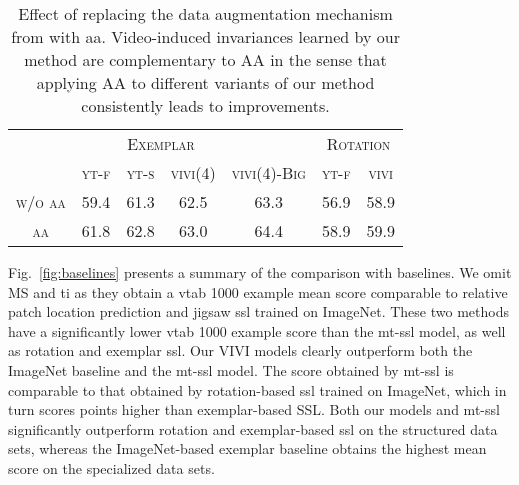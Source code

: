 \documentclass[10pt,twocolumn,letterpaper]{article}
\renewcommand{\paragraph}[1]{\noindent{\bf #1}\quad}
\begin{document}
{\begin{table}
    \centering
    \small
    \small
\setlength{\tabcolsep}{4pt}
\setlength{\extrarowheight}{5pt}
\renewcommand{\arraystretch}{0.75}
\begin{tabular}{ccccccc}
\toprule
\multicolumn{5}{c}{\textsc{Exemplar}} & \multicolumn{2}{c}{\textsc{Rotation}}  \\
\cmidrule(r){2-5}
\cmidrule(r){6-7}
& \textsc{yt-f} & \textsc{yt-s} & \textsc{vivi(4)} & \textsc{vivi(4)-Big} & \textsc{yt-f} & \textsc{vivi}  \\
\midrule
\textsc{w/o aa} &     59.4 &     61.3 &       62.5 &           63.3 &     56.9 &        58.9 \\
\textsc{aa}  & 61.8 & 62.8 &       63.0 &           64.4 &     58.9 &    59.9 \\
\bottomrule
\end{tabular}     \caption{Effect of replacing the data augmentation mechanism from \cite{szegedy2015going} with \gls{aa}. Video-induced invariances learned by our method are complementary to AA in the sense that applying AA to different variants of our method consistently leads to improvements.}\vspace{-4mm}
    \label{tab:autoaugment}
\end{table}

\paragraph{Comparison with related work} Fig.\ \ref{fig:baselines} presents a summary of the comparison with baselines. We omit MS and \gls{ti} as they obtain a \gls{vtab} 1000 example mean score comparable to relative patch location prediction \cite{doersch2015unsupervised} and jigsaw \cite{noroozi2016unsupervised} \gls{ssl} trained on ImageNet. These two methods have a significantly lower \gls{vtab} 1000 example score than the \gls{mt-ssl} model, as well as rotation and exemplar \gls{ssl}.
Our VIVI models clearly outperform both the ImageNet baseline and the \gls{mt-ssl} model. The score obtained by \gls{mt-ssl} is comparable to that obtained by rotation-based \gls{ssl} trained on ImageNet, which in turn scores  points higher than exemplar-based SSL. Both our models and \gls{mt-ssl} significantly outperform rotation and exemplar-based \gls{ssl} on the structured data sets, whereas the ImageNet-based exemplar baseline obtains the highest mean score on the specialized data sets.

}
\end{document}
